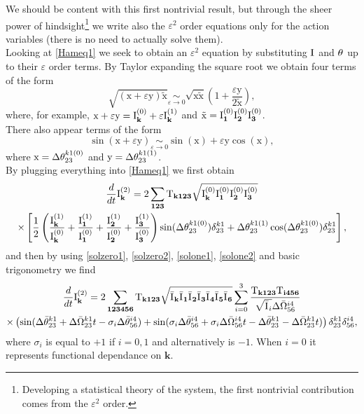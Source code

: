 We should be content with this first nontrivial result, but through the sheer power of hindsight\footnote{Developing a 
statistical theory of the system, the first nontrivial contribution comes from the $\varepsilon^2$ order.}
we write also the 
$\varepsilon^2$ order equations only for the action variables (there is no need to actually solve them). \\
Looking at \eqref{Hameq1} we seek to obtain an $\varepsilon^2$ equation by substituting $\mathrm{I}^{}$ and $\theta^{}$ up to their $\varepsilon$ order terms. By Taylor expanding the square root 
we obtain four terms of the form
\begin{equation}
    \sqrt{(\mathrm{x} +\varepsilon \mathrm{y})\mathrm{\tilde{x}}} \underset{\varepsilon \rightarrow 0}{\sim} 
    \sqrt{\mathrm{x}\mathrm{\tilde{x}}}\left( 1 + \frac{\varepsilon \mathrm{y}}{2\mathrm{\tilde{x}}}\right),
\end{equation}
where, for example, $\mathrm{x} + \varepsilon \mathrm{y} = \mathrm{I}^{(0)}_\mathbf{k} + \varepsilon \mathrm{I}^{(1)}_\mathbf{k}$ and $\mathrm{\tilde{x}} = \mathrm{I}^{(0)}_\mathbf{1}\mathrm{I}^{(0)}_\mathbf{2}\mathrm{I}^{(0)}_\mathbf{3}$.\\
There also appear terms of the form
\begin{equation}
    \sin(\mathrm{x} + \varepsilon \mathrm{y}) \underset{\varepsilon \rightarrow 0}{\sim} \sin(\mathrm{x}) + \varepsilon \mathrm{y} \cos(\mathrm{x}),
\end{equation} 
where $\mathrm{x} = \Delta\theta^{k1(0)}_{23}$ and $\mathrm{y} = \Delta\theta^{k1(1)}_{23}$.\\
By plugging everything into \eqref{Hameq1} we first obtain
\begin{multline}
    \frac{d}{dt} \mathrm{I}^{(2)}_\mathbf{k} = 2 \sum_{\mathbf{123}} \mathrm{T}_{\mathbf{k123}} \sqrt{\mathrm{I}^{(0)}_\mathbf{k}\mathrm{I}^{(0)}_\mathbf{1}\mathrm{I}^{(0)}_\mathbf{2}\mathrm{I}^{(0)}_\mathbf{3}} \\ \times \left[ \frac{1}{2}\left(\frac{\mathrm{I}^{(1)}_\mathbf{k}}{\mathrm{I}^{(0)}_\mathbf{k}}+\frac{\mathrm{I}^{(1)}_\mathbf{1}}{\mathrm{I}^{(0)}_\mathbf{1}}+
    \frac{\mathrm{I}^{(1)}_\mathbf{2}}{\mathrm{I}^{(0)}_\mathbf{2}}+\frac{\mathrm{I}^{(1)}_\mathbf{3}}{\mathrm{I}^{(0)}_\mathbf{3}} \right)\sin(\Delta\theta^{k1(0)}_{23})\delta^{k1}_{23} + 
    \Delta\theta^{k1(1)}_{23}\cos(\Delta\theta^{k1(0)}_{23}) \delta^{k1}_{23}\right],
\end{multline}
and then by using \eqref{solzero1}, \eqref{solzero2}, \eqref{solone1}, \eqref{solone2} and basic trigonometry we find
\begin{multline}
    \frac{d}{dt} \mathrm{I}^{(2)}_\mathbf{k} = 2 \sum_{\mathbf{123456}}\mathrm{T}_{\mathbf{k123}} \sqrt{\bar{\mathrm{I}^{}}_\mathbf{k}\bar{\mathrm{I}^{}}_\mathbf{1}\bar{\mathrm{I}^{}}_\mathbf{2}\bar{\mathrm{I}^{}}_\mathbf{3}\bar{\mathrm{I}^{}}_\mathbf{4}\bar{\mathrm{I}^{}}_\mathbf{5}\bar{\mathrm{I}^{}}_\mathbf{6}} 
    \sum_{i=0}^{3}\frac{\mathrm{T}_{\mathbf{k123}}\mathrm{T}_\mathbf{i456}}{\sqrt{\bar{\mathrm{I}^{}}_i}\Delta\bar{\Omega}^{i4}_{56}} \\
    \times\left(\sin(\Delta\bar{\theta}^{k1}_{23} + \Delta\bar{\Omega}^{k1}_{23}t - \sigma_i \Delta\bar{\theta}^{i4}_{56}) 
    + \sin(\sigma_i \Delta\bar{\theta}^{i4}_{56} + \sigma_i\Delta\bar{\Omega}^{i4}_{56}t -\Delta\bar{\theta}^{k1}_{23} - \Delta\bar{\Omega}^{k1}_{23}t)  \right)\delta^{k1}_{23}\delta^{i4}_{56}, 
    \label{eqeps2}
\end{multline}
where $\sigma_i$ is equal to $+1$ if $i=0,1$ and alternatively is $-1$. When $i=0$ it represents functional dependance on $\mathbf{k}$.\\

